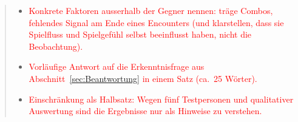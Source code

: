 \documentclass[10pt]{article}
\begin{document}
\begin{abstract}
    \begin{itemize}[nosep, leftmargin=*]
        \item \textcolor{red}{Konkrete Faktoren ausserhalb der Gegner nennen: träge Combos, fehlendes Signal am Ende eines Encounters (und klarstellen, dass sie Spielfluss und Spielgefühl selbst beeinflusst haben, nicht die Beobachtung).}
        \item \textcolor{red}{Vorläufige Antwort auf die Erkenntnisfrage aus Abschnitt~\ref{sec:Beantwortung} in einem Satz (ca.\ 25 Wörter).}
        \item \textcolor{red}{Einschränkung als Halbsatz: Wegen fünf Testpersonen und qualitativer Auswertung sind die Ergebnisse nur als Hinweise zu verstehen.}
    \end{itemize}
\end{abstract}

\newpage


\tableofcontents

\newpage



\newpage


\newpage


\newpage


\newpage


\newpage


\newpage


\newpage


\newpage


\newpage
\end{document}
